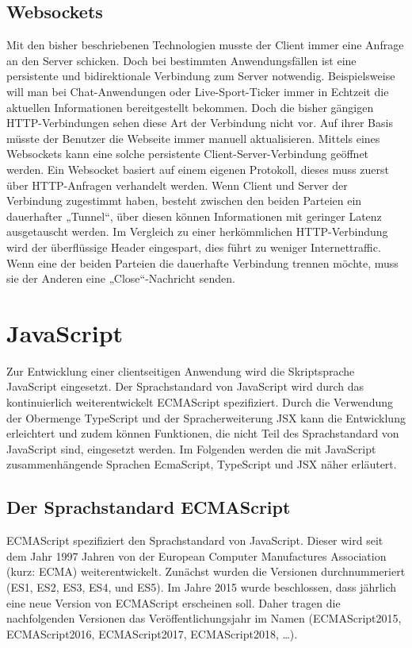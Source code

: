 \subsection{Websockets}

Mit den bisher beschriebenen Technologien musste der Client immer eine Anfrage an den Server schicken. Doch bei bestimmten Anwendungsfällen ist eine persistente und bidirektionale Verbindung zum Server notwendig. Beispielsweise will man bei Chat-Anwendungen oder Live-Sport-Ticker immer in Echtzeit die aktuellen Informationen bereitgestellt bekommen. Doch die bisher gängigen HTTP-Verbindungen sehen diese Art der Verbindung nicht vor. Auf ihrer Basis müsste der Benutzer die Webseite immer manuell aktualisieren. Mittels eines Websockets kann eine solche persistente Client-Server-Verbindung geöffnet werden. Ein Websocket basiert auf einem eigenen Protokoll, dieses muss zuerst über HTTP-Anfragen verhandelt werden. Wenn Client und Server der Verbindung zugestimmt haben, besteht zwischen den beiden Parteien ein dauerhafter „Tunnel“, über diesen können Informationen mit geringer Latenz ausgetauscht werden. Im Vergleich zu einer herkömmlichen HTTP-Verbindung wird der überflüssige Header eingespart, dies führt zu weniger Internettraffic. Wenn eine der beiden Parteien die dauerhafte Verbindung trennen möchte, muss sie der Anderen eine „Close“-Nachricht senden.\autocites[vgl.][11\psqq]{Fink2014}

\section{JavaScript}\label{sec:js}
Zur Entwicklung einer clientseitigen Anwendung wird die Skriptsprache JavaScript eingesetzt. Der Sprachstandard von JavaScript wird durch das  kontinuierlich weiterentwickelt ECMAScript spezifiziert. Durch die Verwendung der Obermenge TypeScript und der Spracherweiterung JSX kann die Entwicklung erleichtert und zudem können Funktionen, die nicht Teil des Sprachstandard von JavaScript sind, eingesetzt werden. Im Folgenden werden die mit JavaScript zusammenhängende Sprachen EcmaScript, TypeScript und JSX  näher erläutert.

\subsection{Der Sprachstandard ECMAScript}\label{sec:der-sprachstandard-ecmascript}
ECMAScript spezifiziert den Sprachstandard von JavaScript. Dieser wird seit dem Jahr 1997 Jahren von der European Computer Manufactures Association (kurz: ECMA) weiterentwickelt. Zunächst wurden die Versionen durchnummeriert (ES1, ES2, ES3, ES4, und ES5). Im Jahre 2015 wurde beschlossen, dass jährlich eine neue Version von ECMAScript erscheinen soll. Daher tragen die nachfolgenden Versionen das Veröffentlichungsjahr im Namen (ECMAScript2015, ECMAScript2016, ECMAScript2017, ECMAScript2018, …). 

